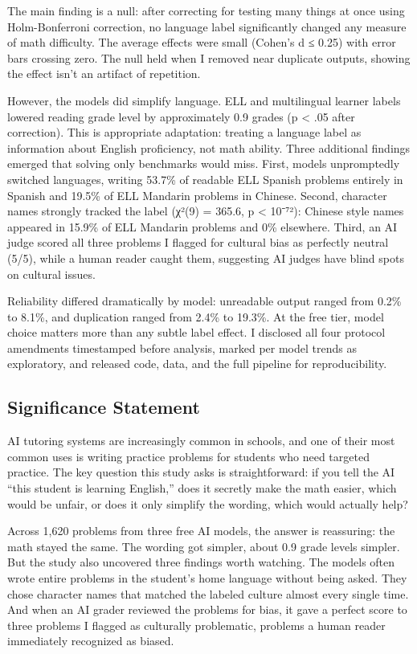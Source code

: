 \documentclass[
]{article}
\begin{document}
The main finding is a null: after correcting for testing many things at
once using Holm-Bonferroni correction, no language label significantly
changed any measure of math difficulty. The average effects were small
(Cohen's d ≤ 0.25) with error bars crossing zero. The null held when I
removed near duplicate outputs, showing the effect isn't an artifact of
repetition.

However, the models did simplify language. ELL and multilingual learner
labels lowered reading grade level by approximately 0.9 grades (p
\textless{} .05 after correction). This is appropriate adaptation:
treating a language label as information about English proficiency, not
math ability. Three additional findings emerged that solving only
benchmarks would miss. First, models unpromptedly switched languages,
writing 53.7\% of readable ELL Spanish problems entirely in Spanish and
19.5\% of ELL Mandarin problems in Chinese. Second, character names
strongly tracked the label (χ²(9) = 365.6, p \textless{} 10⁻⁷²): Chinese
style names appeared in 15.9\% of ELL Mandarin problems and 0\%
elsewhere. Third, an AI judge scored all three problems I flagged for
cultural bias as perfectly neutral (5/5), while a human reader caught
them, suggesting AI judges have blind spots on cultural issues.

Reliability differed dramatically by model: unreadable output ranged
from 0.2\% to 8.1\%, and duplication ranged from 2.4\% to 19.3\%. At the
free tier, model choice matters more than any subtle label effect. I
disclosed all four protocol amendments timestamped before analysis,
marked per model trends as exploratory, and released code, data, and the
full pipeline for reproducibility.

\hypertarget{significance-statement}{%
\subsection{Significance Statement}\label{significance-statement}}

AI tutoring systems are increasingly common in schools, and one of their
most common uses is writing practice problems for students who need
targeted practice. The key question this study asks is straightforward:
if you tell the AI ``this student is learning English,'' does it
secretly make the math easier, which would be unfair, or does it only
simplify the wording, which would actually help?

Across 1,620 problems from three free AI models, the answer is
reassuring: the math stayed the same. The wording got simpler, about 0.9
grade levels simpler. But the study also uncovered three findings worth
watching. The models often wrote entire problems in the student's home
language without being asked. They chose character names that matched
the labeled culture almost every single time. And when an AI grader
reviewed the problems for bias, it gave a perfect score to three
problems I flagged as culturally problematic, problems a human reader
immediately recognized as biased.
\end{document}
